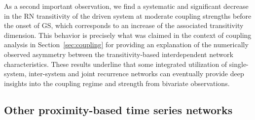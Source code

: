 As a second important observation, we find a systematic and significant decrease in the RN transitivity of the driven system at moderate coupling strengths before the onset of GS, which corresponds to an increase of the associated transitivity dimension. This behavior is precisely what was claimed in the context of coupling analysis in Section~\ref{sec:coupling} for providing an explanation of the numerically observed asymmetry between the transitivity-based interdependent network characteristics. These results underline that some integrated utilization of single-system, inter-system and joint recurrence networks can eventually provide deep insights into the coupling regime and strength from bivariate observations.


	\subsection{Other proximity-based time series networks}
